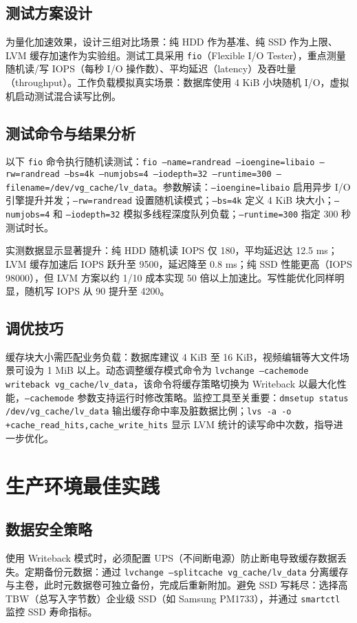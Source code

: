 \section{测试方案设计}
为量化加速效果，设计三组对比场景：纯 HDD 作为基准、纯 SSD 作为上限、LVM 缓存加速作为实验组。测试工具采用 \texttt{fio}（Flexible I/O Tester），重点测量随机读/写 IOPS（每秒 I/O 操作数）、平均延迟（latency）及吞吐量（throughput）。工作负载模拟真实场景：数据库使用 4 KiB 小块随机 I/O，虚拟机启动测试混合读写比例。\par
\section{测试命令与结果分析}
以下 \texttt{fio} 命令执行随机读测试：\texttt{fio --name=randread --ioengine=libaio --rw=randread --bs=4k --numjobs=4 --iodepth=32 --runtime=300 --filename=/dev/vg\_{}cache/lv\_{}data}。参数解读：\texttt{--ioengine=libaio} 启用异步 I/O 引擎提升并发；\texttt{--rw=randread} 设置随机读模式；\texttt{--bs=4k} 定义 4 KiB 块大小；\texttt{--numjobs=4} 和 \texttt{--iodepth=32} 模拟多线程深度队列负载；\texttt{--runtime=300} 指定 300 秒测试时长。\par
实测数据显示显著提升：纯 HDD 随机读 IOPS 仅 180，平均延迟达 12.5 ms；LVM 缓存加速后 IOPS 跃升至 9500，延迟降至 0.8 ms；纯 SSD 性能更高（IOPS 98000），但 LVM 方案以约 1/10 成本实现 50 倍以上加速比。写性能优化同样明显，随机写 IOPS 从 90 提升至 4200。\par
\section{调优技巧}
缓存块大小需匹配业务负载：数据库建议 4 KiB 至 16 KiB，视频编辑等大文件场景可设为 1 MiB 以上。动态调整缓存模式命令为 \texttt{lvchange --cachemode writeback vg\_{}cache/lv\_{}data}，该命令将缓存策略切换为 Writeback 以最大化性能，\texttt{--cachemode} 参数支持运行时修改策略。监控工具至关重要：\texttt{dmsetup status /dev/vg\_{}cache/lv\_{}data} 输出缓存命中率及脏数据比例；\texttt{lvs -a -o +cache\_{}read\_{}hits,cache\_{}write\_{}hits} 显示 LVM 统计的读写命中次数，指导进一步优化。\par
\chapter{生产环境最佳实践}
\section{数据安全策略}
使用 Writeback 模式时，必须配置 UPS（不间断电源）防止断电导致缓存数据丢失。定期备份元数据：通过 \texttt{lvchange --splitcache vg\_{}cache/lv\_{}data} 分离缓存与主卷，此时元数据卷可独立备份，完成后重新附加。避免 SSD 写耗尽：选择高 TBW（总写入字节数）企业级 SSD（如 Samsung PM1733），并通过 \texttt{smartctl} 监控 SSD 寿命指标。\par
